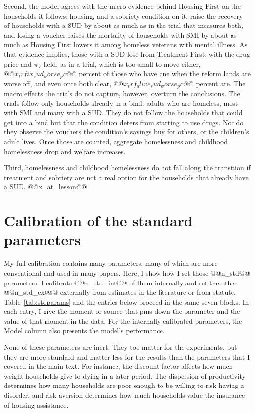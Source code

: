 \documentclass[10pt]{article}
\begin{document}
Second, the model agrees with the micro evidence behind Housing First on the households it follows: housing, and a sobriety condition on it, raise the recovery of households with a SUD by about as much as in the trial that measures both, and losing a voucher raises the mortality of households with SMI by about as much as Housing First lowers it among homeless veterans with mental illness. As that evidence implies, those with a SUD lose from Treatment First: with the drug price and $\pi_V$ held, as in a trial, which is too small to move either, $@@x_trfix_sud_worse_pc@@$ percent of those who have one when the reform lands are worse off, and even once both clear, $@@x_trf_alive_sud_worse_pc@@$ percent are. The macro effects the trials do not capture, however, overturn the conclusions. The trials follow only households already in a bind: adults who are homeless, most with SMI and many with a SUD. They do not follow the households that could get into a bind but that the condition deters from starting to use drugs. Nor do they observe the vouchers the condition's savings buy for others, or the children's adult lives. Once those are counted, aggregate homelessness and childhood homelessness drop and welfare increases.

Third, homelessness and childhood homelessness do not fall along the transition if treatment and sobriety are not a real option for the households that already have a SUD. @@x_at_lesson@@

\clearpage
\appendix
\setcounter{table}{0}
\section[Calibration of the standard parameters]{Calibration of the standard parameters}\label{sec:stdparams}

  My full calibration contains many parameters, many of which are more conventional and used in many papers. Here, I show how I set those @@n_std@@ parameters. I calibrate @@n_std_int@@ of them internally and set the other @@n_std_ext@@ externally from estimates in the literature or from statute. Table~\ref{tab:stdparams} and the entries below proceed in the same seven blocks. In each entry, I give the moment or source that pins down the parameter and the value of that moment in the data. For the internally calibrated parameters, the Model column also presents the model's performance.

 None of these parameters are inert. They too matter for the experiments, but they are more standard and matter less for the results than the parameters that I covered in the main text. For instance, the discount factor affects how much weight households give to dying in a later period. The dispersion of productivity determines how many households are poor enough to be willing to risk having a disorder, and risk aversion determines how much households value the insurance of housing assistance.
\end{document}
